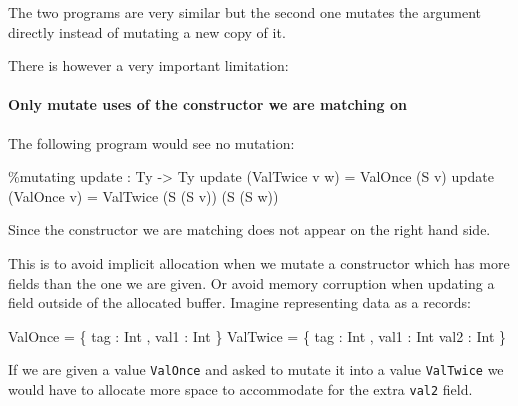 \documentclass[
]{article}
\newenvironment{Shaded}{}{}
\newcommand{\DataTypeTok}[1]{\textcolor[rgb]{0.56,0.13,0.00}{#1}}
\newcommand{\NormalTok}[1]{#1}
\newcommand{\OperatorTok}[1]{\textcolor[rgb]{0.40,0.40,0.40}{#1}}
\newcommand{\OtherTok}[1]{\textcolor[rgb]{0.00,0.44,0.13}{#1}}
\begin{document}
The two programs are very similar but the second one mutates the
argument directly instead of mutating a new copy of it.

There is however a very important limitation:

\hypertarget{only-mutate-uses-of-the-constructor-we-are-matching-on}{%
\paragraph{Only mutate uses of the constructor we are matching
on}\label{only-mutate-uses-of-the-constructor-we-are-matching-on}}

The following program would see no mutation:

\begin{Shaded}
\begin{Highlighting}[]
\OperatorTok{\%}\NormalTok{mutating}
\NormalTok{update }\OperatorTok{:} \DataTypeTok{Ty} \OtherTok{{-}\textgreater{}} \DataTypeTok{Ty}
\NormalTok{update (}\DataTypeTok{ValTwice}\NormalTok{ v w) }\OtherTok{=} \DataTypeTok{ValOnce}\NormalTok{ (}\DataTypeTok{S}\NormalTok{ v)}
\NormalTok{update (}\DataTypeTok{ValOnce}\NormalTok{ v) }\OtherTok{=} \DataTypeTok{ValTwice}\NormalTok{ (}\DataTypeTok{S}\NormalTok{ (}\DataTypeTok{S}\NormalTok{ v)) (}\DataTypeTok{S}\NormalTok{ (}\DataTypeTok{S}\NormalTok{ w))}
\end{Highlighting}
\end{Shaded}

Since the constructor we are matching does not appear on the right hand
side.

This is to avoid implicit allocation when we mutate a constructor which
has more fields than the one we are given. Or avoid memory corruption
when updating a field outside of the allocated buffer. Imagine
representing data as a records:

\begin{Shaded}
\begin{Highlighting}[]
\DataTypeTok{ValOnce} \OtherTok{=}\NormalTok{ \{ tag }\OperatorTok{:} \DataTypeTok{Int}\NormalTok{ , val1 }\OperatorTok{:} \DataTypeTok{Int}\NormalTok{ \}}
\DataTypeTok{ValTwice} \OtherTok{=}\NormalTok{ \{ tag }\OperatorTok{:} \DataTypeTok{Int}\NormalTok{ , val1 }\OperatorTok{:} \DataTypeTok{Int}\NormalTok{ val2 }\OperatorTok{:} \DataTypeTok{Int}\NormalTok{ \}}
\end{Highlighting}
\end{Shaded}

If we are given a value \texttt{ValOnce} and asked to mutate it into a
value \texttt{ValTwice} we would have to allocate more space to
accommodate for the extra \texttt{val2} field.
\end{document}
